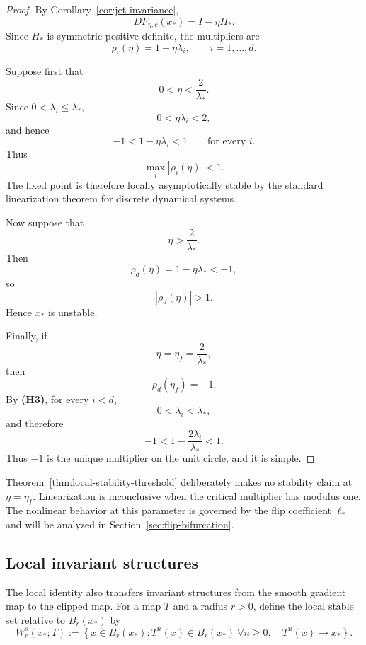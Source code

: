 \begin{proof}
By Corollary~\ref{cor:jet-invariance},
\[
DF_{\eta,c}(x_*)
=
I-\eta H_*.
\]
Since $H_*$ is symmetric positive definite, the multipliers are
\[
\rho_i(\eta)
=
1-\eta\lambda_i,
\qquad
i=1,\ldots,d.
\]

Suppose first that
\[
0<\eta<\frac{2}{\lambda_*}.
\]
Since $0<\lambda_i\leq\lambda_*$,
\[
0<\eta\lambda_i<2,
\]
and hence
\[
-1
<
1-\eta\lambda_i
<
1
\qquad
\text{for every }i.
\]
Thus
\[
\max_i|\rho_i(\eta)|<1.
\]
The fixed point is therefore locally asymptotically stable by the
standard linearization theorem for discrete dynamical systems.

Now suppose that
\[
\eta>\frac{2}{\lambda_*}.
\]
Then
\[
\rho_d(\eta)
=
1-\eta\lambda_*
<
-1,
\]
so
\[
|\rho_d(\eta)|>1.
\]
Hence $x_*$ is unstable.

Finally, if
\[
\eta=\eta_f=\frac{2}{\lambda_*},
\]
then
\[
\rho_d(\eta_f)=-1.
\]
By \textbf{(H3)}, for every $i<d$,
\[
0<\lambda_i<\lambda_*,
\]
and therefore
\[
-1
<
1-\frac{2\lambda_i}{\lambda_*}
<
1.
\]
Thus $-1$ is the unique multiplier on the unit circle, and it is
simple.
\end{proof}

\begin{remark}
\label{rem:boundary-inconclusive-linearly}
Theorem~\ref{thm:local-stability-threshold} deliberately makes no
stability claim at $\eta=\eta_f$.  Linearization is inconclusive
when the critical multiplier has modulus one.  The nonlinear
behavior at this parameter is governed by the flip coefficient
$\ell_*$ and will be analyzed in Section~\ref{sec:flip-bifurcation}.
\end{remark}

\subsection{Local invariant structures}
\label{subsec:local-invariant-structures}

The local identity also transfers invariant structures from the
smooth gradient map to the clipped map.  For a map $T$ and a radius
$r>0$, define the local stable set relative to $B_r(x_*)$ by
\begin{equation}
W^s_r(x_*;T)
:=
\left\{
x\in B_r(x_*):
T^n(x)\in B_r(x_*)\ \forall n\geq0,
\quad
T^n(x)\to x_*
\right\}.
\label{eq:relative-local-stable-set}
\end{equation}


